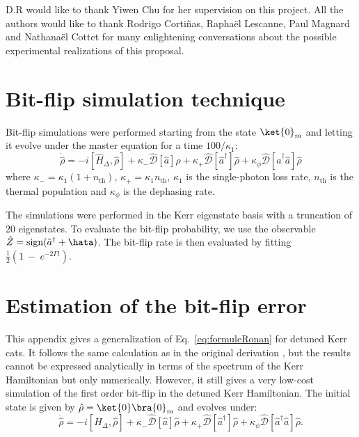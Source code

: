 \begin{acknowledgments}
D.R would like to thank Yiwen Chu for her supervision on this project. All the authors would like to thank Rodrigo Cortiñas, Raphaël Lescanne, Paul Magnard and Nathanaël Cottet for many enlightening conversations about the possible experimental realizations of this proposal. 
\end{acknowledgments}




\newpage
\appendix

\section{\label{sec:appendixA}Bit-flip simulation technique}

Bit-flip simulations were performed starting from the state $\ket{0}_m$ and letting it evolve under the master equation for a time $100/\kappa_1$:
\begin{equation}
    \dot{\hat \rho} = -i [\hat H_\Delta,\hat \rho] + \kappa_- \mathcal{\hat D}[\hat a]\rho + \kappa_+ \mathcal{\hat D}[\hat a^\dagger]\hat \rho + \kappa_\phi \mathcal{\hat D}[\hat a^\dagger \hat a]\hat \rho
\end{equation}
where $\kappa_- = \kappa_1 (1 + n_{\text{th}})$, $\kappa_+ = \kappa_1 n_{\text{th}}$, $\kappa_1$ is the single-photon loss rate, $n_{\text{th}}$ is the thermal population and $\kappa_\phi$ is the dephasing rate.

The simulations were performed in the Kerr eigenstate basis with a truncation of 20 eigenstates. To evaluate the bit-flip probability, we use the observable $\hat Z  = \text{sign}(\hat{a}^{\dagger} + \hata)$. The bit-flip rate is then evaluated by fitting $\frac{1}{2}(1~-~e^{-2 \Gamma t})$.

\section{\label{sec:appendixB}Estimation of the bit-flip error}

This appendix gives a generalization of Eq.~\eqref{eq:formuleRonan} for detuned Kerr cats. It follows the same calculation as in the original derivation \cite{Gautier2022}, but the results cannot be expressed analytically in terms of the spectrum of the Kerr Hamiltonian but only numerically. However, it still gives a very low-cost simulation of the first order bit-flip in the detuned Kerr Hamiltonian.
The initial state is given by $\hat \rho= \ket{0}\bra{0}_m$ and evolves under:
\begin{equation}
    \dot{\hat \rho} = -i [\hat H_\Delta,\hat \rho] + \kappa_- \mathcal{\hat D}[\hat a]\hat \rho + \kappa_+ \mathcal{\hat D}[\hat a^\dagger]\hat \rho + \kappa_\phi \mathcal{\hat D}[\hat a^\dagger \hat a]\hat \rho.
\end{equation}

